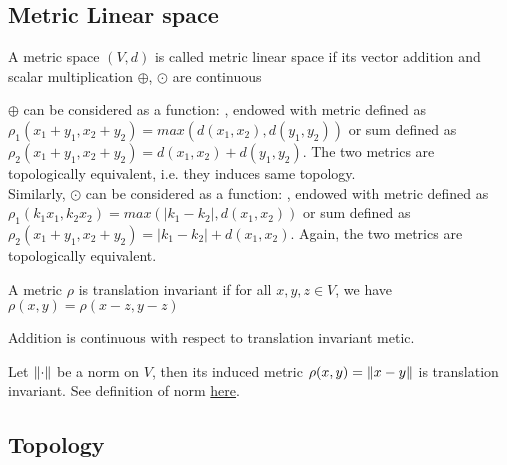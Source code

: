 \subsection{Metric Linear space}\label{Metric linear space}
\begin{definition}\rm\nextline
	A metric space $(V,d)$ is called metric linear space if its vector addition and scalar multiplication $\oplus$, $\odot$ are continuous
\end{definition}


\begin{remark}\rm\nextline
	$\oplus$ can be considered as a function: , endowed with metric  defined as $\rho_1(x_1+y_1,x_2+y_2)=max(d(x_1,x_2),d(y_1,y_2))$
	or sum  defined as $\rho_2(x_1+y_1,x_2+y_2)=d(x_1,x_2)+d(y_1,y_2)$. The two metrics are topologically equivalent, i.e. they induces same topology.\\
	Similarly, $\odot$ can be considered as a function: , endowed with metric  defined as $\rho_1(k_1x_1,k_2x_2)=max(|k_1-k_2|,d(x_1,x_2))$
	or sum  defined as $\rho_2(x_1+y_1,x_2+y_2)=|k_1-k_2|+d(x_1,x_2)$. Again, the two metrics are topologically equivalent.
\end{remark}

\begin{definition}\rm\nextline
	A metric $\rho$ is translation invariant if for all $x,y,z\in V$, we have  $\rho(x,y)=\rho(x-z,y-z)$
\end{definition}

\begin{proposition}\rm\nextline
	Addition is continuous with respect to translation invariant metic.
\end{proposition}

\begin{proposition}\rm\nextline
	Let $\left\|{\cdot}\right\|$ be a norm on $V$, then its induced metric $\rho(x,y)=\left\|{x-y}\right\|$ is translation invariant. See definition of norm {\color{red} \hyperref[definition of norm]{here}}.
\end{proposition}

\subsection{Topology}\label{topology}

